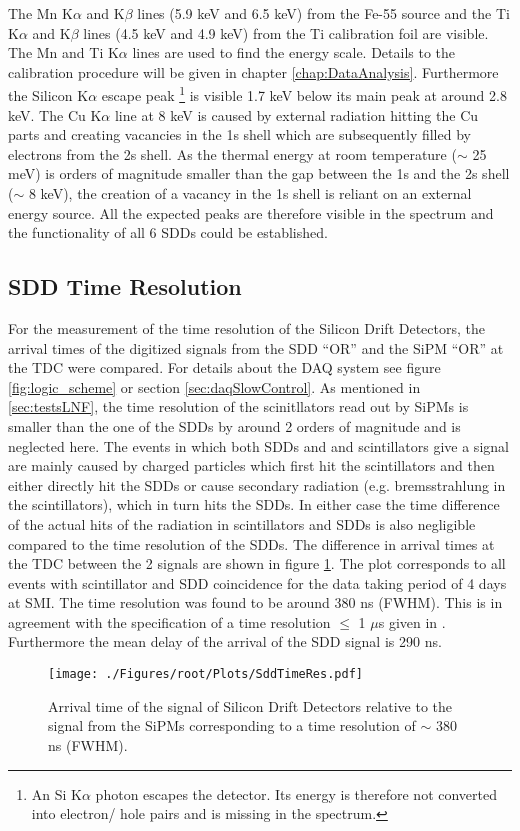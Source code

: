 The Mn K$\alpha$ and K$\beta$ lines (5.9 keV and 6.5 keV) from the Fe-55 source and the Ti K$\alpha$ and K$\beta$ lines (4.5 keV and 4.9 keV) from the Ti calibration foil are visible. The Mn and Ti K$\alpha$ lines are used to find the energy scale. Details to the calibration procedure will be given in chapter \ref{chap:DataAnalysis}. Furthermore the Silicon K$\alpha$ escape peak \footnote{An Si K$\alpha$ photon escapes the detector. Its energy is therefore not converted into electron/ hole pairs and is missing in the spectrum. } is visible 1.7 keV below its main peak at around 2.8 keV. The Cu K$\alpha$ line at 8 keV is caused by external radiation hitting the Cu parts and creating vacancies in the 1s shell which are subsequently filled by electrons from the 2s shell. As the thermal energy at room temperature ($\sim$ 25 meV) is orders of magnitude smaller than the gap between the 1s and the 2s shell ($\sim$ 8 keV), the creation of a vacancy in the 1s shell is reliant on an external energy source. All the expected peaks are therefore visible in the spectrum and the functionality of all 6 SDDs could be established.

\subsection{SDD Time Resolution}

For the measurement of the time resolution of the Silicon Drift Detectors, the arrival times of the digitized signals from the SDD ``OR'' and the SiPM ``OR'' at the TDC were compared. For details about the DAQ system see figure \ref{fig:logic_scheme} or section \ref{sec:daqSlowControl}. As mentioned in \ref{sec:testsLNF}, the time resolution of the scinitllators read out by SiPMs is smaller than the one of the SDDs by around 2 orders of magnitude and is neglected here. The events in which both SDDs and and scintillators give a signal are mainly caused by charged particles which first hit the scintillators and then either directly hit the SDDs or cause secondary radiation (e.g. bremsstrahlung in the scintillators), which in turn hits the SDDs. In either case the time difference of the actual hits of the radiation in scintillators and SDDs is also negligible compared to the time resolution of the SDDs. The difference in arrival times at the TDC between the 2 signals are shown in figure \ref{fig:sddTimeRes}. The plot corresponds to all events with scintillator and SDD coincidence for the data taking period of 4 days at SMI. The time resolution was found to be around 380 ns (FWHM). This is in agreement with the specification of a time resolution $\leq$ 1 $\mu$s given in \cite{Lechner}. Furthermore the mean delay of the arrival of the SDD signal is 290 ns.
\begin{figure}[h]
 \centering
 \texttt{[image: ./Figures/root/Plots/SddTimeRes.pdf]}
 \caption{Arrival time of the signal of Silicon Drift Detectors relative to the signal from the SiPMs corresponding to a time resolution of $\sim$ 380 ns (FWHM).}
 \label{fig:sddTimeRes}
\end{figure}

